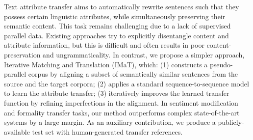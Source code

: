 Text attribute transfer aims to automatically rewrite sentences such that they possess certain linguistic attributes, while simultaneously preserving their semantic content. This task remains challenging due to a  lack of supervised parallel data. Existing approaches try to explicitly disentangle content and attribute information, but this is difficult and often results in poor content-preservation and ungrammaticality. In contrast, we propose a simpler approach, Iterative Matching and Translation (IMaT), which: (1) constructs a pseudo-parallel corpus by aligning a subset of semantically similar sentences from the source and the target corpora; (2) applies a standard sequence-to-sequence model to learn the attribute transfer; (3) iteratively improves the learned transfer function by refining imperfections in the alignment. In sentiment modification and formality transfer tasks, our  method outperforms complex state-of-the-art systems by a large margin. As an auxiliary contribution, we produce a publicly-available test set with human-generated transfer references.